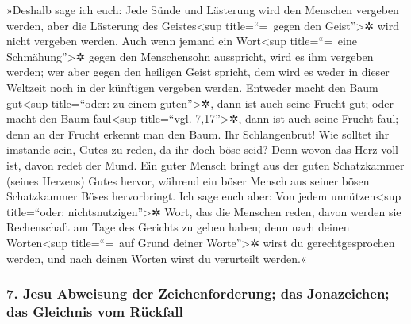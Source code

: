  »Deshalb sage ich euch: Jede Sünde und Lästerung wird
den Menschen vergeben werden, aber die Lästerung des
Geistes\textless sup title=``=~gegen den Geist''\textgreater✲ wird nicht
vergeben werden.  Auch wenn jemand ein Wort\textless sup
title=``=~eine Schmähung''\textgreater✲ gegen den Menschensohn
ausspricht, wird es ihm vergeben werden; wer aber gegen den heiligen
Geist spricht, dem wird es weder in dieser Weltzeit noch in der
künftigen vergeben werden.  Entweder macht den Baum
gut\textless sup title=``oder: zu einem guten''\textgreater✲, dann ist
auch seine Frucht gut; oder macht den Baum faul\textless sup
title=``vgl. 7,17''\textgreater✲, dann ist auch seine Frucht faul; denn
an der Frucht erkennt man den Baum.  Ihr Schlangenbrut!
Wie solltet ihr imstande sein, Gutes zu reden, da ihr doch böse seid?
Denn wovon das Herz voll ist, davon redet der Mund.  Ein
guter Mensch bringt aus der guten Schatzkammer (seines Herzens) Gutes
hervor, während ein böser Mensch aus seiner bösen Schatzkammer Böses
hervorbringt.  Ich sage euch aber: Von jedem
unnützen\textless sup title=``oder: nichtsnutzigen''\textgreater✲ Wort,
das die Menschen reden, davon werden sie Rechenschaft am Tage des
Gerichts zu geben haben;  denn nach deinen
Worten\textless sup title=``=~auf Grund deiner Worte''\textgreater✲
wirst du gerechtgesprochen werden, und nach deinen Worten wirst du
verurteilt werden.«

\hypertarget{jesu-abweisung-der-zeichenforderung-das-jonazeichen-das-gleichnis-vom-ruxfcckfall}{%
\subsubsection{7. Jesu Abweisung der Zeichenforderung; das Jonazeichen;
das Gleichnis vom
Rückfall}\label{jesu-abweisung-der-zeichenforderung-das-jonazeichen-das-gleichnis-vom-ruxfcckfall}}

